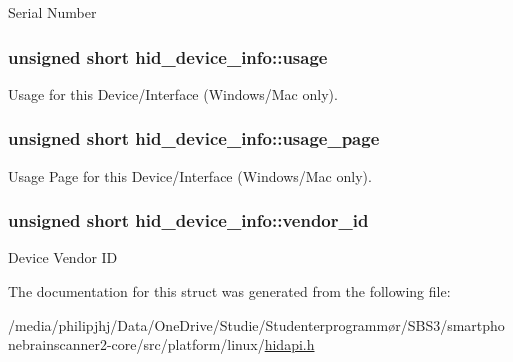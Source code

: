 Serial Number \hypertarget{structhid__device__info_a47f8011d58bcddd67f1403d6d3b4cab6}{
\subsubsection[{usage}]{\setlength{\rightskip}{0pt plus 5cm}unsigned short hid\-\_\-device\-\_\-info\-::usage}}\label{structhid__device__info_a47f8011d58bcddd67f1403d6d3b4cab6}
Usage for this Device/\-Interface (Windows/\-Mac only). \hypertarget{structhid__device__info_ab811117f8084ce2036815bdd33b16b3b}{
\subsubsection[{usage\-\_\-page}]{\setlength{\rightskip}{0pt plus 5cm}unsigned short hid\-\_\-device\-\_\-info\-::usage\-\_\-page}}\label{structhid__device__info_ab811117f8084ce2036815bdd33b16b3b}
Usage Page for this Device/\-Interface (Windows/\-Mac only). \hypertarget{structhid__device__info_a5037a3914e0bd8a3f821d1be9376c709}{
\subsubsection[{vendor\-\_\-id}]{\setlength{\rightskip}{0pt plus 5cm}unsigned short hid\-\_\-device\-\_\-info\-::vendor\-\_\-id}}\label{structhid__device__info_a5037a3914e0bd8a3f821d1be9376c709}
Device Vendor I\-D 

The documentation for this struct was generated from the following file\-:\begin{DoxyCompactItemize}
\item 
/media/philipjhj/\-Data/\-One\-Drive/\-Studie/\-Studenterprogrammør/\-S\-B\-S3/smartphonebrainscanner2-\/core/src/platform/linux/\hyperlink{linux_2hidapi_8h}{hidapi.\-h}\end{DoxyCompactItemize}

